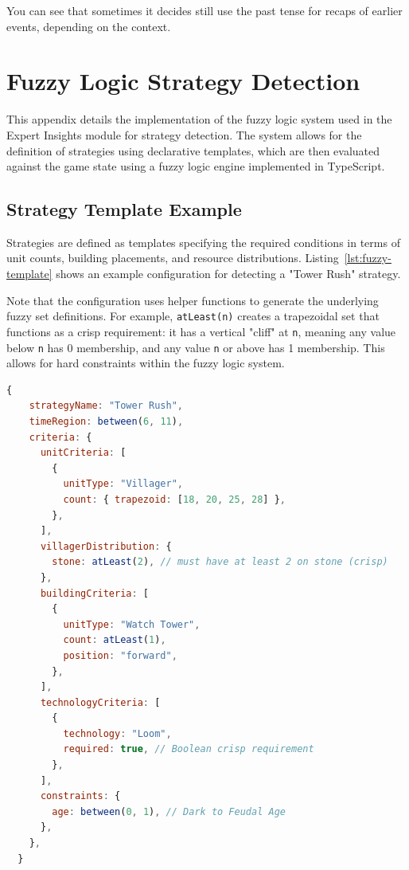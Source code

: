 You can see that sometimes it decides still use the past tense for recaps of earlier events, depending on the context.

\section{Fuzzy Logic Strategy Detection}
\label{appendix:fuzzy-logic}

This appendix details the implementation of the fuzzy logic system used in the Expert Insights module for strategy detection. The system allows for the definition of strategies using declarative templates, which are then evaluated against the game state using a fuzzy logic engine implemented in TypeScript.

\subsection*{Strategy Template Example}
Strategies are defined as templates specifying the required conditions in terms of unit counts, building placements, and resource distributions. Listing~\ref{lst:fuzzy-template} shows an example configuration for detecting a "Tower Rush" strategy.

Note that the configuration uses helper functions to generate the underlying fuzzy set definitions. For example, \texttt{atLeast(n)} creates a trapezoidal set that functions as a crisp requirement: it has a vertical "cliff" at \texttt{n}, meaning any value below \texttt{n} has 0 membership, and any value \texttt{n} or above has 1 membership. This allows for hard constraints within the fuzzy logic system.

\begin{lstlisting}[language=JavaScript,caption={Configuration template for Tower Rush strategy},label={lst:fuzzy-template}]
 {
    strategyName: "Tower Rush",
    timeRegion: between(6, 11),
    criteria: {
      unitCriteria: [
        {
          unitType: "Villager",
          count: { trapezoid: [18, 20, 25, 28] },
        },
      ],
      villagerDistribution: {
        stone: atLeast(2), // must have at least 2 on stone (crisp)
      },
      buildingCriteria: [
        {
          unitType: "Watch Tower",
          count: atLeast(1),
          position: "forward",
        },
      ],
      technologyCriteria: [
        {
          technology: "Loom",
          required: true, // Boolean crisp requirement
        },
      ],
      constraints: {
        age: between(0, 1), // Dark to Feudal Age
      },
    },
  }
\end{lstlisting}

